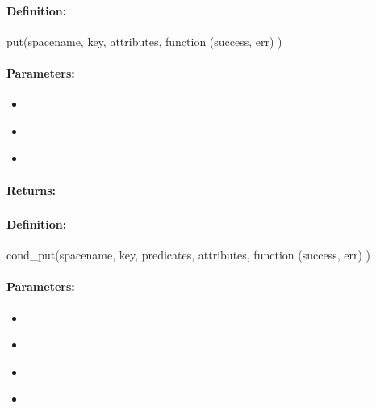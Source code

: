 \paragraph{Definition:}
\begin{javascriptcode}
put(spacename, key, attributes, function (success, err) {})
\end{javascriptcode}
\paragraph{Parameters:}
\begin{itemize}[noitemsep]
\item {}\\

\item {}\\

\item {}\\

\end{itemize}

\paragraph{Returns:}


\pagebreak
\subsubsection{}
\label{api:nodejs:cond_put}


\paragraph{Definition:}
\begin{javascriptcode}
cond_put(spacename, key, predicates, attributes, function (success, err) {})
\end{javascriptcode}
\paragraph{Parameters:}
\begin{itemize}[noitemsep]
\item {}\\

\item {}\\

\item {}\\

\item {}\\

\end{itemize}

